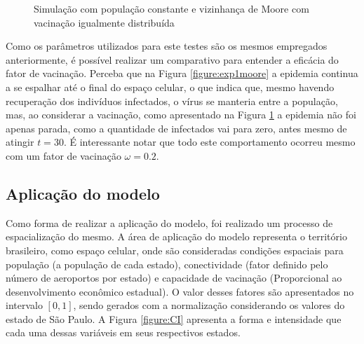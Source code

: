 \documentclass[a4paper,12pt]{article}
\begin{document}
\begin{figure}[!ht]
\qquad
{}
\qquad
{}
\caption{Simulação com população constante e vizinhança de Moore com vacinação igualmente distribuída}
\label{figure:vac1moore}
\end{figure}


Como os parâmetros utilizados para este testes são os mesmos empregados anteriormente, é possível realizar um comparativo para entender a eficácia do fator de vacinação. Perceba que na Figura \ref{figure:exp1moore} a epidemia continua a se espalhar até o final do espaço celular, o que indica que, mesmo havendo recuperação dos indivíduos infectados, o vírus se manteria entre a população, mas, ao considerar a vacinação, como apresentado na Figura \ref{figure:vac1moore} a epidemia não foi apenas parada, como a quantidade de infectados vai para zero, antes mesmo de atingir $t = 30$. É interessante notar que todo este comportamento ocorreu mesmo com um fator de vacinação $\omega = 0.2$.

\subsection{Aplicação do modelo}

Como forma de realizar a aplicação do modelo, foi realizado um processo de espacialização do mesmo. A área de aplicação do modelo representa o território brasileiro, como espaço celular, onde são consideradas condições espaciais para população (a população de cada estado), conectividade (fator definido pelo número de aeroportos por estado) e capacidade de vacinação (Proporcional ao desenvolvimento econômico estadual). O valor desses fatores são apresentados no intervalo $[0,1]$, sendo gerados com a normalização considerando os valores do estado de São Paulo. A Figura \ref{figure:CI} apresenta a forma e intensidade que cada uma dessas variáveis em seus respectivos estados. 
\end{document}
